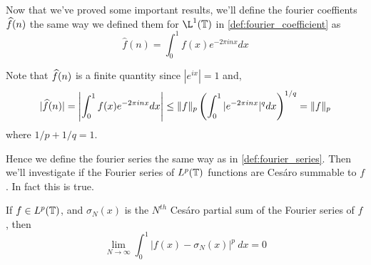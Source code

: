 Now that we've proved some important results, we'll define the fourier coeffients $\widehat{f}(n)$ the same way we defined them for $\L^1(\T)$ in \autoref{def:fourier_coefficient} as 
$$\hat{f}(n) = \int_0^1 f(x)e^{-2\pi inx} dx$$

Note that $\widehat{f}(n)$ is a finite quantity since $|e^{ix}| = 1$ and,
$$ |\widehat{f}(n)| = \left| \int_0^1 f(x)e^{-2\pi inx} dx \right| \le \|f\|_p\left(\int_0^1 |e^{-2\pi inx}|^q dx\right)^{1/q} = \|f\|_p $$ where $1/p + 1/q = 1$.

Hence we define the fourier series the same way as in \autoref{def:fourier_series}. Then we'll investigate if the Fourier series of $L^p(\mathbb T)$ functions are Ces\'aro summable to $f$. In fact this is true.

\begin{theorem}
  If $f\in L^p(\mathbb T)$, and $\sigma_N(x)$ is the $N^{th}$ Ces\'aro partial sum of the Fourier series of $f$, then
  $$ \lim_{N \to \infty} \int_0^1 |f(x) - \sigma_N(x)|^p \ dx = 0$$
\end{theorem}

